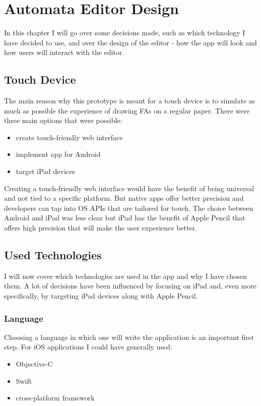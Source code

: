 \chapter{Automata Editor Design}
\label{chap:design}

In this chapter I will go over some decisions made, such as which technology I have decided to use, and over the design of the editor - how the app will look and how users will interact with the editor.

\section{Touch Device}
The main reason why this prototype is meant for a touch device is to simulate as much as possible the experience of drawing FAs on a regular paper. There were three main options that were possible:
\begin{itemize}
    \item create touch-friendly web interface
    \item implement app for Android
    \item target iPad devices
\end{itemize}
Creating a touch-friendly web interface would have the benefit of being universal and not tied to a specific platform. But native apps offer better precision and developers can tap into OS APIs that are tailored for touch. The choice between Android and iPad was less clear but iPad has the benefit of Apple Pencil \cite{apple-pencil} that offers high precision that will make the user experience better.

\section{Used Technologies}

I will now cover which technologies are used in the app and why I have chosen them. A lot of decisions have been influenced by focusing on iPad and, even more specifically, by targeting iPad devices along with Apple Pencil. 

\subsection{Language}

Choosing a language in which one will write the application is an important first step. For iOS applications I could have generally used:
\begin{itemize}
    \item Objective-C
    \item Swift
    \item cross-platform framework
\end{itemize}

